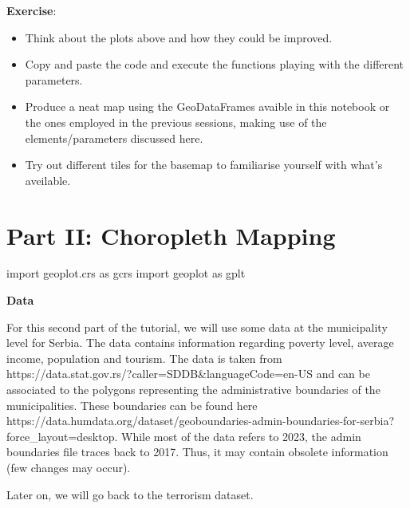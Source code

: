 \documentclass[
  letterpaper,
  DIV=11,
  numbers=noendperiod]{scrreprt}
\newenvironment{Shaded}{\begin{snugshade}}{\end{snugshade}}
\newcommand{\ImportTok}[1]{\textcolor[rgb]{0.00,0.46,0.62}{#1}}
\newcommand{\NormalTok}[1]{\textcolor[rgb]{0.00,0.23,0.31}{#1}}
\providecommand{\tightlist}{%
  \setlength{\itemsep}{0pt}\setlength{\parskip}{0pt}}\usepackage{longtable,booktabs,array}
\begin{document}
\textbf{Exercise}:

\begin{itemize}
\tightlist
\item
  Think about the plots above and how they could be improved.
\item
  Copy and paste the code and execute the functions playing with the
  different parameters.
\item
  Produce a neat map using the GeoDataFrames avaible in this notebook or
  the ones employed in the previous sessions, making use of the
  elements/parameters discussed here.
\item
  Try out different tiles for the basemap to familiarise yourself with
  what's aveilable.
\end{itemize}

\section{Part II: Choropleth Mapping}\label{part-ii-choropleth-mapping}

\begin{Shaded}
\begin{Highlighting}[]
\ImportTok{import}\NormalTok{ geoplot.crs }\ImportTok{as}\NormalTok{ gcrs}
\ImportTok{import}\NormalTok{ geoplot }\ImportTok{as}\NormalTok{ gplt}
\end{Highlighting}
\end{Shaded}

\textbf{Data}

For this second part of the tutorial, we will use some data at the
municipality level for Serbia. The data contains information regarding
poverty level, average income, population and tourism. The data is taken
from https://data.stat.gov.rs/?caller=SDDB\&languageCode=en-US and can
be associated to the polygons representing the administrative boundaries
of the municipalities. These boundaries can be found here
https://data.humdata.org/dataset/geoboundaries-admin-boundaries-for-serbia?force\_layout=desktop.
While most of the data refers to 2023, the admin boundaries file traces
back to 2017. Thus, it may contain obsolete information (few changes may
occur).

Later on, we will go back to the terrorism dataset.
\end{document}
